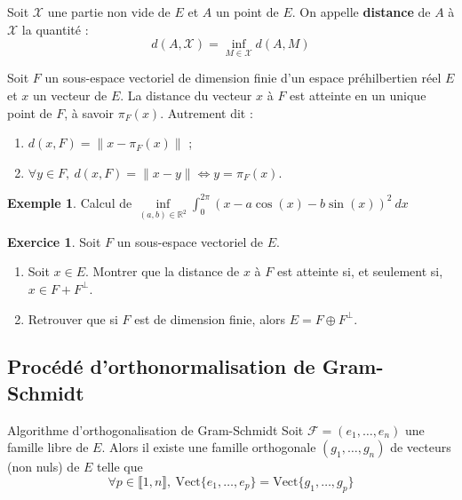 \documentclass[french]{article}
\newcommand{\R}{\mathbb{R}}
\theoremstyle{plain}
\theoremstyle{definition}
\newtheorem*{ex}{Exemple}
\newtheorem{exo}{Exercice}
\theoremstyle{remark}
\begin{document}
\begin{dfn}
	Soit $\mathcal{X}$ une partie non vide de $E$ et $A$ un point de $E$. On appelle \textbf{distance} de $A$ à $\mathcal{X}$ la quantité : $$d(A,\mathcal{X})=\underset{M\in\mathcal{X}}{\inf}d(A,M)$$
\end{dfn}

\begin{thm}{}
	Soit $F$ un sous-espace vectoriel de dimension finie d'un espace préhilbertien réel $E$ et $x$ un vecteur de $E$. La distance du vecteur $x$ à $F$ est atteinte en un unique point de $F$, à savoir $\pi_F(x)$. Autrement dit : 
	\begin{enumerate}
		\item $d(x,F)=\lVert x-\pi_F(x)\rVert$ ;
		\item $\forall y\in F,\ d(x,F)=\lVert x-y\rVert\iff y=\pi_F(x)$.
	\end{enumerate}
\end{thm}

\begin{ex}
	Calcul de $\displaystyle\underset{(a,b)\in\R^2}{\inf}\int_{0}^{2\pi}(x-a\cos(x)-b\sin(x))^2\ dx$
\end{ex}

\begin{exo}
	Soit $F$ un sous-espace vectoriel de $E$.
	\begin{enumerate}
		\item Soit $x\in E$. Montrer que la distance de $x$ à $F$ est atteinte si, et seulement si, $x\in F+F^\bot$.
		\item Retrouver que si $F$ est de dimension finie, alors $E=F\oplus F^\bot$.
	\end{enumerate}
\end{exo}

\subsection{Procédé d'orthonormalisation de Gram-Schmidt}

\begin{thm}{Algorithme d'orthogonalisation de Gram-Schmidt}
	Soit $\mathcal{F}=(e_1,\ldots,e_n)$ une famille libre de $E$. Alors il existe une famille orthogonale $(g_1,\ldots,g_n)$ de vecteurs (non nuls) de $E$ telle que $$\forall p\in\llbracket 1,n\rrbracket,\ \text{Vect}\{e_1,\ldots,e_p\}=\text{Vect}\{g_1,\ldots,g_p\}$$
\end{thm}
\end{document}

